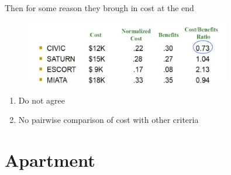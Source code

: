 \documentclass[aspectratio=1610,pdftex,dvipsnames,compress,xcolor={dvipsnames}]{beamer}
\begin{document}
\begin{frame}{Then for some reason they brough in cost at the end}
    \begin{figure}
        \centering
        \includegraphics[width=0.80\textwidth]{ahp_cost.jpg}
    \end{figure}

    \begin{enumerate}[series=outerlist,topsep=0pt,itemsep=21pt,leftmargin=*,label=(\arabic*)]
        \item[]Do not agree
        \item[]No pairwise comparison of cost with other criteria
    \end{enumerate}
\end{frame}


\section{Apartment}
\end{document}
